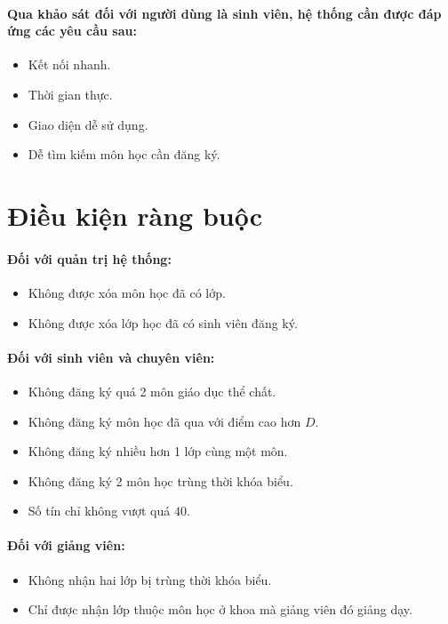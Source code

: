 \documentclass[12pt]{book}
\begin{document}
    \paragraph{
      \textnormal{
        Qua khảo sát đối với người dùng là sinh viên, hệ thống cần được đáp ứng các yêu cầu sau:
      }
    }
    \begin{itemize}
      \item Kết nối nhanh.
      \item Thời gian thực.
      \item Giao diện dễ sử dụng.
      \item Dễ tìm kiếm môn học cần đăng ký.
    \end{itemize}
  
  \section{Điều kiện ràng buộc}
    \paragraph{Đối với quản trị hệ thống:}
    \begin{itemize}
      \item Không được xóa môn học đã có lớp.
      \item Không được xóa lớp học đã có sinh viên đăng ký.
    \end{itemize}

    \paragraph{Đối với sinh viên và chuyên viên:}
    \begin{itemize}
      \item Không đăng ký quá 2 môn giáo dục thể chất.
      \item Không đăng ký môn học đã qua với điểm cao hơn $ D $.
      \item Không đăng ký nhiều hơn 1 lớp cùng một môn.
      \item Không đăng ký 2 môn học trùng thời khóa biểu.
      \item Số tín chỉ không vượt quá $ 40 $.
    \end{itemize}

    \paragraph{Đối với giảng viên:}
    \begin{itemize}
      \item Không nhận hai lớp bị trùng thời khóa biểu.
      \item Chỉ được nhận lớp thuộc môn học ở khoa mà giảng viên đó giảng dạy.
    \end{itemize}
\end{document}
